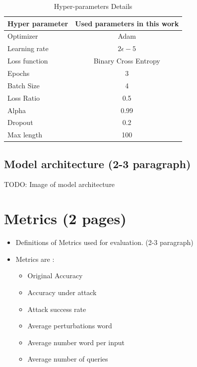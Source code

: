 \documentclass[%
	BCOR=8mm, %
	DIV=12, 
	toc=bibliography, %
	toc=listof, %
	oneside, %
	egregdoesnotlikesansseriftitles, %
	]{scrbook}
\begin{document}
\begin{table}[!h]
\centering
\begin{tabular}{ l c c }
\hline
Hyper parameter 		& \multicolumn{2}{c}{Used parameters in this work}\\
\hline
Optimizer 				& \multicolumn{2}{c}{Adam} \\
Learning rate 			& \multicolumn{2}{c}{ $2\epsilon -5$ } \\
Loss function 			& \multicolumn{2}{c}{Binary Cross Entropy}  \\
Epochs 				& \multicolumn{2}{c}{$3$} \\
Batch Size 			& \multicolumn{2}{c}{4 } \\
Loss Ratio 			&\multicolumn{2}{c}{0.5}\\
Alpha 			&\multicolumn{2}{c}{0.99}\\
Dropout  			& \multicolumn{2}{c}{0.2}  \\
Max length 			 & \multicolumn{2}{c}{100}  \\
\hline
\end{tabular}
\caption[Hyper-parameters with test run results]{Hyper-parameters Details}
\label{table:HyperparameterTable}
\end{table}


\subsection{ Model architecture (2-3 paragraph)}

TODO: Image of model architecture 
\section{Metrics (2 pages)}

\begin{itemize}
\item Definitions of Metrics used for evaluation. (2-3 paragraph)
\item Metrics are :
\begin{itemize}
\item Original Accuracy 
\item Accuracy under attack 
\item Attack success rate 
\item Average perturbations word 
\item Average number word per input
\item Average number of queries 
\end{itemize}
\end{itemize}
\end{document}
